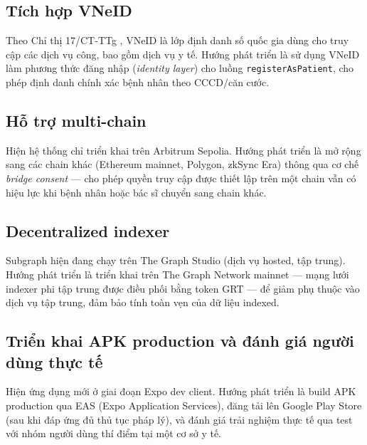 \documentclass[../DoAn]{subfiles}
\begin{document}
\subsection{Tích hợp VNeID}

Theo Chỉ thị 17/CT-TTg \cite{ct17_ttg}, VNeID là lớp định danh số quốc gia dùng cho truy cập các dịch vụ công, bao gồm dịch vụ y tế. Hướng phát triển là sử dụng VNeID làm phương thức đăng nhập (\textit{identity layer}) cho luồng \texttt{registerAsPatient}, cho phép định danh chính xác bệnh nhân theo CCCD/căn cước.

\subsection{Hỗ trợ multi-chain}

Hiện hệ thống chỉ triển khai trên Arbitrum Sepolia. Hướng phát triển là mở rộng sang các chain khác (Ethereum mainnet, Polygon, zkSync Era) thông qua cơ chế \textit{bridge consent} --- cho phép quyền truy cập được thiết lập trên một chain vẫn có hiệu lực khi bệnh nhân hoặc bác sĩ chuyển sang chain khác.

\subsection{Decentralized indexer}

Subgraph hiện đang chạy trên The Graph Studio (dịch vụ hosted, tập trung). Hướng phát triển là triển khai trên The Graph Network mainnet --- mạng lưới indexer phi tập trung được điều phối bằng token GRT --- để giảm phụ thuộc vào dịch vụ tập trung, đảm bảo tính toàn vẹn của dữ liệu indexed.

\subsection{Triển khai APK production và đánh giá người dùng thực tế}

Hiện ứng dụng mới ở giai đoạn Expo dev client. Hướng phát triển là build APK production qua EAS (Expo Application Services), đăng tải lên Google Play Store (sau khi đáp ứng đủ thủ tục pháp lý), và đánh giá trải nghiệm thực tế qua test với nhóm người dùng thí điểm tại một cơ sở y tế.
\end{document}
